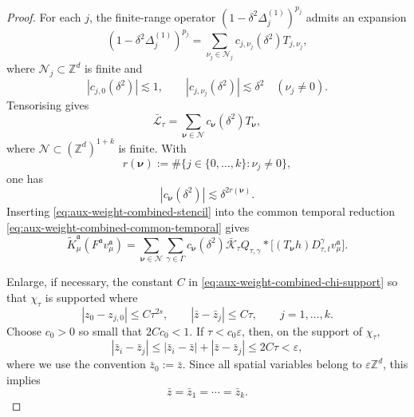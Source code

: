 \documentclass{article}
\numberwithin{equation}{section}
\newcommand{\assign}{:=}
\theoremstyle{plain}
\theoremstyle{definition}
\begin{document}
\begin{proof}
	For each \(j\), the finite-range operator
	\((1-\delta^2\Delta_j^{(1)})^{p_j}\) admits an expansion
	\[
	(1-\delta^2\Delta_j^{(1)})^{p_j}
	=
	\sum_{\nu_j\in\mathcal N_j}
	c_{j,\nu_j}(\delta^2)T_{j,\nu_j},
	\]
	where \(\mathcal N_j\subset\mathbb Z^d\) is finite and
	\[
	|c_{j,0}(\delta^2)|\lesssim1,
	\qquad
	|c_{j,\nu_j}(\delta^2)|\lesssim\delta^2
	\quad(\nu_j\neq0).
	\]
	Tensorising gives
	\begin{equation}
		\label{eq:aux-weight-combined-stencil}
		\bar{\mathcal L}_\tau
		=
		\sum_{\boldsymbol\nu\in\mathcal N}
		c_{\boldsymbol\nu}(\delta^2)T_{\boldsymbol\nu},
	\end{equation}
	where
	\(\mathcal N\subset(\mathbb Z^d)^{1+k}\) is finite.  With
	\[
	r(\boldsymbol\nu)
	\assign
	\#\{j\in\{0,\ldots,k\}:\nu_j\neq0\},
	\]
	one has
	\begin{equation}
		\label{eq:aux-weight-combined-coefficients}
		|c_{\boldsymbol\nu}(\delta^2)|
		\lesssim
		\delta^{2r(\boldsymbol\nu)}.
	\end{equation}
	Inserting \eqref{eq:aux-weight-combined-stencil} into the common temporal
	reduction \eqref{eq:aux-weight-combined-common-temporal} gives
	\begin{equation}
		\label{eq:aux-weight-combined-exact-expansion}
		\tilde K_\mu^{\mathfrak a}
		(F^{\mathfrak a}v_\mu^{\mathfrak a})
		=
		\sum_{\boldsymbol\nu\in\mathcal N}
		\sum_{\gamma\in\Gamma}
		c_{\boldsymbol\nu}(\delta^2)
		\bar{\mathcal K}_\tau Q_{\tau,\gamma}*
		\bigl[
		(T_{\boldsymbol\nu}h)
		D_{\tau,t}^{\gamma}v_\mu^{\mathfrak a}
		\bigr].
	\end{equation}
	
	Enlarge, if necessary, the constant \(C\) in
	\eqref{eq:aux-weight-combined-chi-support} so that \(\chi_\tau\) is
	supported where
	\[
	|z_0-z_{j,0}|\leqslant C\tau^{2s},
	\qquad
	|\bar z-\bar z_j|\leqslant C\tau,
	\qquad j=1,\ldots,k.
	\]
	Choose \(c_0>0\) so small that \(2Cc_0<1\).  If
	\(\tau<c_0\varepsilon\), then, on the support of \(\chi_\tau\),
	\[
	|\bar z_i-\bar z_j|
	\leqslant
	|\bar z_i-\bar z|+|\bar z-\bar z_j|
	\leqslant2C\tau
	<\varepsilon,
	\]
	where we use the convention \(\bar z_0\assign\bar z\).  Since all spatial
	variables belong to \(\varepsilon\mathbb Z^d\), this implies
	\begin{equation}
		\label{eq:aux-weight-combined-diagonal}
		\bar z=\bar z_1=\cdots=\bar z_k.
	\end{equation}
	

\end{proof}
\end{document}

